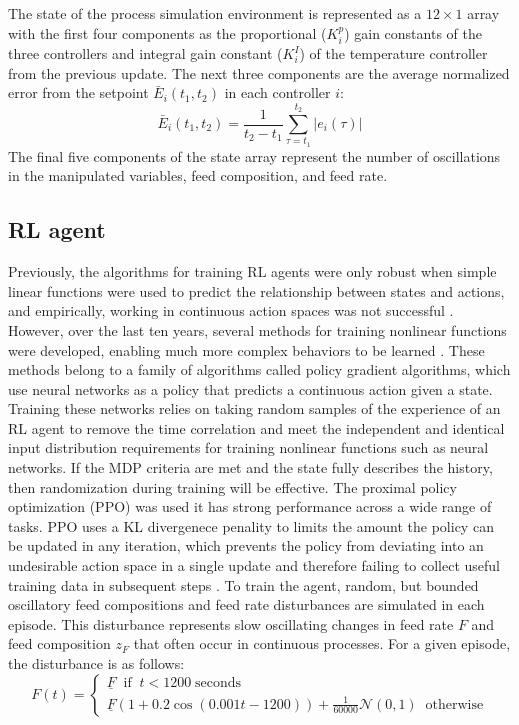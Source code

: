 The state of the process simulation environment is represented as a $12\times 1$ array with the first four components as the proportional ($K_i^p$) gain constants of the three controllers and integral gain constant ($K_i^I$) of the temperature controller from the previous update. The next three components are the average normalized error from the setpoint $\bar E_i(t_1,t_2)$ in each controller $i$:
\begin{equation}
	\bar E_i(t_1, t_2) =\frac{1}{t_2-t_1}\sum_{\tau=t_1}^{t_2} \lvert e_i(\tau) \rvert
\end{equation}
The final five components of the state array represent the number of oscillations in the manipulated variables, feed composition, and feed rate. 

\subsection{RL agent}
Previously, the algorithms for training RL agents were only robust when simple linear functions were used to predict the relationship between states and actions, and empirically, working in continuous action spaces was not successful \cite{Sutton2018}. However, over the last ten years, several methods for training nonlinear functions were developed, enabling much more complex behaviors to be learned \cite{Mnih2013, Lillicrap2016}. These methods belong to a family of algorithms called policy gradient algorithms, which use neural networks as a policy that predicts a continuous action given a state. Training these networks relies on taking random samples of the experience of an RL agent to remove the time correlation and meet the independent and identical input distribution requirements for training nonlinear functions such as neural networks. If the MDP criteria are met and the state fully describes the history, then randomization during training will be effective. The proximal policy optimization (PPO) was used \cite{Schulman2017} it has strong performance across a wide range of tasks. PPO uses a KL divergenece penality to limits the amount the policy can be updated in any iteration, which prevents the policy from deviating into an undesirable action space in a single update and therefore failing to collect useful training data in subsequent steps \cite{Schulman2017, Engstrom2020}. To train the agent, random, but bounded oscillatory feed compositions and feed rate disturbances are simulated in each episode. This disturbance represents slow oscillating changes in feed rate $F$ and feed composition $z_F$ that often occur in continuous processes. For a given episode, the disturbance is as follows:
\begin{equation}
	F(t) = 
	\begin{cases}
		\underline F \;\; \text{if}\;\; t < 1200 \;\text{seconds} \\
		\underline F(1+ 0.2\cos(0.001t-1200))+\frac{1}{60000} \mathcal{N}(0,1) \;\; \text{otherwise}
	\end{cases}
\end{equation}

